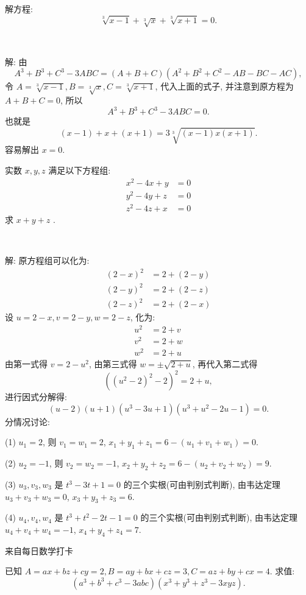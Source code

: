 解方程: 
\[\sqrt[3]{x-1} + \sqrt[3]{x} + \sqrt[3]{x+1} = 0 .\]

~

解: 由 
\[A^3+B^3+C^3 - 3ABC = (A+B+C)(A^2+B^2+C^2-AB-BC-AC), \]
令 $A = \sqrt[3]{x-1}, B = \sqrt[3]{x}, C = \sqrt[3]{x+1}$, 代入上面的式子, 并注意到原方程为 $A+B+C = 0$, 所以
\[A^3+B^3+C^3-3ABC = 0.\]
也就是
\[(x-1) + x + (x+1) = 3\sqrt[3]{(x-1)x(x+1)} .\]
容易解出 $x = 0$.

\newpage
实数 $x,y,z$ 满足以下方程组:
\begin{align*}
x^2 - 4x + y &= 0 \\
y^2 - 4y + z &= 0\\
z^2 - 4z + x &= 0
\end{align*}
求 $x+y+z$ .

~

解: 原方程组可以化为:
\begin{align*}
(2-x)^2 &= 2 + (2-y) \\
(2-y)^2 &= 2 + (2-z)\\
(2-z)^2 &= 2 + (2-x)
\end{align*}
设 $u = 2-x, v = 2-y, w = 2-z$, 化为:
\begin{align*}
u^2 &= 2 + v \\
v^2 &= 2 + w\\
w^2 &= 2 + u
\end{align*}
由第一式得 $v = 2 - u^2$, 由第三式得 $w = \pm\sqrt{2+u}$, 再代入第二式得
\[((u^2-2)^2 - 2)^2 = 2+u  ,\]
进行因式分解得:
\[(u-2)(u+1)(u^3-3u+1)(u^3+u^2-2u-1) = 0 .\]
分情况讨论:

(1) $u_1 = 2$, 则 $v_1 = w_1 = 2$, $x_1+y_1+z_1 = 6 - (u_1+v_1+w_1) = 0.$

(2) $u_2 = -1$, 则 $v_2 = w_2 = -1$, $x_2+y_2+z_2 = 6 - (u_2+v_2+w_2) = 9.$

(3) $u_3, v_3, w_3$ 是 $t^3-3t+1=0$ 的三个实根(可由判别式判断), 由韦达定理 $u_3+v_3+w_3 = 0$, $x_3+y_3+z_3 = 6$.

(4) $u_4, v_4, w_4$ 是 $t^3+t^2-2t-1=0$ 的三个实根(可由判别式判断), 由韦达定理 $u_4+v_4+w_4 = -1$, $x_4+y_4+z_4 = 7$.


\newpage
\noindent 来自每日数学打卡

已知 $A = ax + bz + cy = 2, B = ay + bx + cz = 3, C = az + by + cx = 4$. 求值:
\[(a^3+b^3+c^3-3abc)(x^3+y^3+z^3-3xyz) .\]

~

